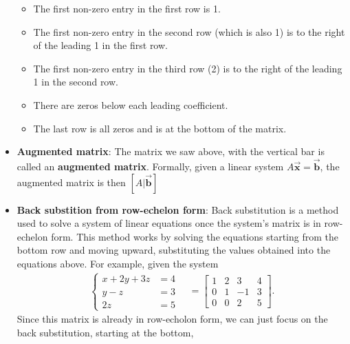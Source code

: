 \documentclass{report}
\begin{document}
\begin{itemize}
                \begin{itemize}
                    \item The first non-zero entry in the first row is 1.
                    \item The first non-zero entry in the second row (which is also 1) is to the right of the leading 1 in the first row.
                    \item The first non-zero entry in the third row (2) is to the right of the leading 1 in the second row.
                    \item There are zeros below each leading coefficient.
                    \item The last row is all zeros and is at the bottom of the matrix.
                \end{itemize}
                \bigbreak \noindent 
            \item \textbf{Augmented matrix}: The matrix we saw above, with the vertical bar is called an \textbf{augmented matrix}. Formally, given a linear system $A\vec{\mathbf{x}} = \vec{\mathbf{b}}$, the augmented matrix is then $\left[A | \vec{\mathbf{b}}\right] $
            \item \textbf{Back substition from row-echelon form}: Back substitution is a method used to solve a system of linear equations once the system's matrix is in row-echelon form. This method works by solving the equations starting from the bottom row and moving upward, substituting the values obtained into the equations above.
                \bigbreak \noindent 
                For example, given the system
                \begin{align*}
                            \begin{cases}
                                x + 2y + 3z &= 4 \\
                                y - z &= 3 \\
                                2z &= 5
                            \end{cases} \quad = 
                    \left[\begin{array}{ccc|c}
                            1 & 2 & 3 & 4 \\
                            0 & 1 & -1 & 3 \\
                            0 & 0 & 2 & 5
                    \end{array}\right]
                .\end{align*}
                \bigbreak \noindent 
                Since this matrix is already in row-echolon form, we can just focus on the back substitution, starting at the bottom,

\end{itemize}
\end{document}
